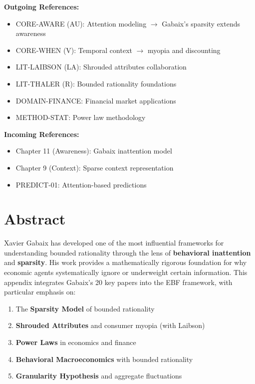 \begin{tcolorbox}[colback=green!5!white, colframe=green!75!black, title=Cross-Reference Map]
\textbf{Outgoing References:}
\begin{itemize}[nosep]
    \item CORE-AWARE (AU): Attention modeling $\rightarrow$ Gabaix's sparsity extends awareness
    \item CORE-WHEN (V): Temporal context $\rightarrow$ myopia and discounting
    \item LIT-LAIBSON (LA): Shrouded attributes collaboration
    \item LIT-THALER (R): Bounded rationality foundations
    \item DOMAIN-FINANCE: Financial market applications
    \item METHOD-STAT: Power law methodology
\end{itemize}

\textbf{Incoming References:}
\begin{itemize}[nosep]
    \item Chapter 11 (Awareness): Gabaix inattention model
    \item Chapter 9 (Context): Sparse context representation
    \item PREDICT-01: Attention-based predictions
\end{itemize}
\end{tcolorbox}

\section*{Abstract}

Xavier Gabaix has developed one of the most influential frameworks for understanding bounded rationality through the lens of \textbf{behavioral inattention} and \textbf{sparsity}. His work provides a mathematically rigorous foundation for why economic agents systematically ignore or underweight certain information. This appendix integrates Gabaix's 20 key papers into the EBF framework, with particular emphasis on:
\begin{enumerate}
    \item The \textbf{Sparsity Model} of bounded rationality
    \item \textbf{Shrouded Attributes} and consumer myopia (with Laibson)
    \item \textbf{Power Laws} in economics and finance
    \item \textbf{Behavioral Macroeconomics} with bounded rationality
    \item \textbf{Granularity Hypothesis} and aggregate fluctuations
\end{enumerate}

